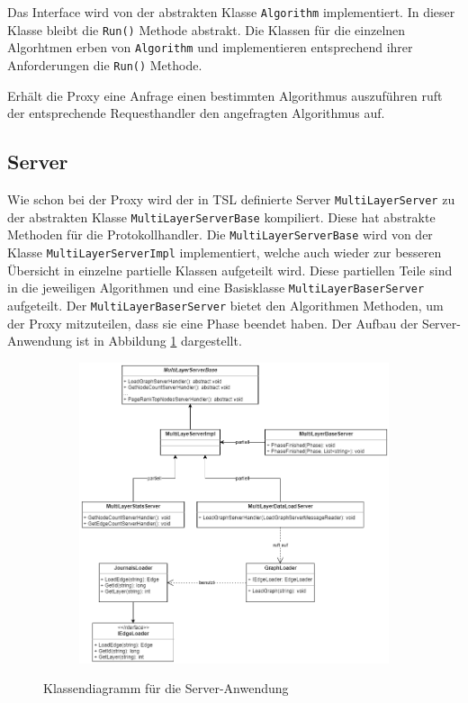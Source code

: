 Das Interface wird von der abstrakten Klasse \verb|Algorithm| implementiert. In dieser Klasse bleibt die \verb|Run()| Methode abstrakt.
Die Klassen für die einzelnen Algorhtmen erben von \verb|Algorithm| und implementieren entsprechend ihrer Anforderungen die \verb|Run()| Methode.

Erhält die Proxy eine Anfrage einen bestimmten Algorithmus auszuführen ruft der entsprechende Requesthandler den angefragten Algorithmus auf.



\subsection{Server}

Wie schon bei der Proxy wird der in TSL definierte Server \verb|MultiLayerServer| zu der abstrakten Klasse \verb|MultiLayerServerBase| kompiliert. Diese hat abstrakte Methoden für die Protokollhandler.
Die \verb|MultiLayerServerBase| wird von der Klasse \verb|MultiLayerServerImpl| implementiert, welche auch wieder zur besseren Übersicht in einzelne partielle Klassen aufgeteilt wird. Diese partiellen Teile sind in die jeweiligen Algorithmen und eine Basisklasse \verb|MultiLayerBaserServer| aufgeteilt.
Der \verb|MultiLayerBaserServer| bietet den Algorithmen Methoden, um der Proxy mitzuteilen, dass sie eine Phase beendet haben.
Der Aufbau der Server-Anwendung ist in Abbildung \ref{serverClass} dargestellt.


\begin{figure}
  \centering
  \begin{subfigure}[b]{1.0\textwidth}
    \includegraphics[width=1.0\linewidth]{img/Klassendiagramm-Server.png}
  \end{subfigure}
  \caption{Klassendiagramm für die Server-Anwendung}
  \label{serverClass}
\end{figure}


